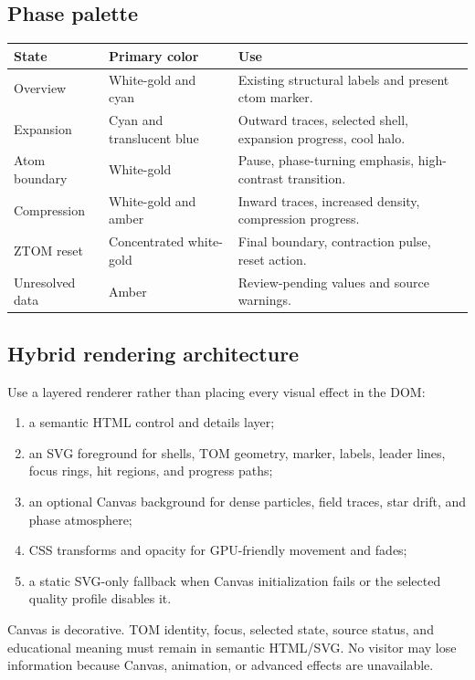 \documentclass[11pt,letterpaper]{article}
\begin{document}
\subsection{Phase palette}
\begin{tabularx}{\textwidth}{L{1.7in}L{1.2in}Y}
\toprule
\textbf{State} & \textbf{Primary color} & \textbf{Use} \\
\midrule
Overview & White-gold and cyan & Existing structural labels and present ctom marker. \\
Expansion & Cyan and translucent blue & Outward traces, selected shell, expansion progress, cool halo. \\
Atom boundary & White-gold & Pause, phase-turning emphasis, high-contrast transition. \\
Compression & White-gold and amber & Inward traces, increased density, compression progress. \\
ZTOM reset & Concentrated white-gold & Final boundary, contraction pulse, reset action. \\
Unresolved data & Amber & Review-pending values and source warnings. \\
\bottomrule
\end{tabularx}

\subsection{Hybrid rendering architecture}
Use a layered renderer rather than placing every visual effect in the DOM:
\begin{enumerate}
\item a semantic HTML control and details layer;
\item an SVG foreground for shells, TOM geometry, marker, labels, leader lines, focus rings, hit regions, and progress paths;
\item an optional Canvas background for dense particles, field traces, star drift, and phase atmosphere;
\item CSS transforms and opacity for GPU-friendly movement and fades;
\item a static SVG-only fallback when Canvas initialization fails or the selected quality profile disables it.
\end{enumerate}

Canvas is decorative. TOM identity, focus, selected state, source status, and educational meaning must remain in semantic HTML/SVG. No visitor may lose information because Canvas, animation, or advanced effects are unavailable.
\end{document}
